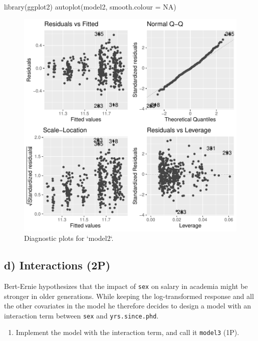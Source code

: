 \documentclass[
]{article}
\newenvironment{Shaded}{\begin{snugshade}}{\end{snugshade}}
\newcommand{\AttributeTok}[1]{\textcolor[rgb]{0.77,0.63,0.00}{#1}}
\newcommand{\ConstantTok}[1]{\textcolor[rgb]{0.00,0.00,0.00}{#1}}
\newcommand{\FunctionTok}[1]{\textcolor[rgb]{0.00,0.00,0.00}{#1}}
\newcommand{\NormalTok}[1]{#1}
\providecommand{\tightlist}{%
  \setlength{\itemsep}{0pt}\setlength{\parskip}{0pt}}
\begin{document}
\begin{Shaded}
\begin{Highlighting}[]
\FunctionTok{library}\NormalTok{(ggplot2)}
\FunctionTok{autoplot}\NormalTok{(model2, }\AttributeTok{smooth.colour =} \ConstantTok{NA}\NormalTok{)}
\end{Highlighting}
\end{Shaded}

\begin{figure}

{\centering \includegraphics[width=0.6\linewidth]{compulsory_files/figure-latex/fig_model_check_log-transform-1} 

}

\caption{Diagnostic plots for `model2`.}\label{fig:fig_model_check_log-transform}
\end{figure}

\hypertarget{d-interactions-2p}{%
\subsection{d) Interactions (2P)}\label{d-interactions-2p}}

Bert-Ernie hypothesizes that the impact of \texttt{sex} on salary in
academia might be stronger in older generations. While keeping the
log-transformed response and all the other covariates in the model he
therefore decides to design a model with an interaction term between
\texttt{sex} and \texttt{yrs.since.phd}.

\begin{enumerate}
\def\labelenumi{\roman{enumi})}
\tightlist
\item
  Implement the model with the interaction term, and call it
  \texttt{model3} (1P).
\end{enumerate}
\end{document}
